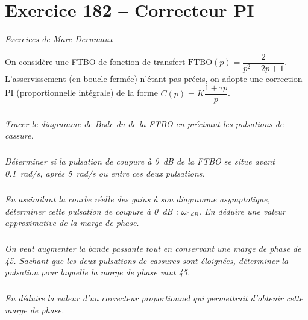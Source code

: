 \section*{Exercice 182 -- Correcteur PI}
\setcounter{exo}{0}

\textit{Exercices de Marc Derumaux}

On considère une FTBO de fonction de transfert $\text{FTBO}(p)= \dfrac{2}{p^2+2p+1}$. L'asservissement (en
boucle fermée) n'étant pas précis, on adopte une correction PI (proportionnelle intégrale) de la
forme $C( p)=K\dfrac{1+\tau p}{p}$.

\subparagraph{}
\textit{Tracer le diagramme de Bode du de la FTBO en précisant les pulsations de cassure.}
\ifprof
\begin{corrige}
\end{corrige}
\else
\fi

\subparagraph{}
\textit{Déterminer si la pulsation de coupure à \SI{0}{dB} de la FTBO se situe avant \SI{0,1}{rad/s}, après \SI{5}{
rad/s} ou entre ces deux pulsations.}
\ifprof
\begin{corrige}
\end{corrige}
\else
\fi

\subparagraph{}
\textit{En assimilant la courbe réelle des gains à son diagramme asymptotique, déterminer cette
pulsation de coupure à \SI{0}{dB} : $\omega_{\SI{0}{dB}}$. En déduire une valeur approximative de la marge de
phase.}
\ifprof
\begin{corrige}
\end{corrige}
\else
\fi

\subparagraph{}
\textit{On veut augmenter la bande passante tout en conservant une marge de phase de 45\degres.
Sachant que les deux pulsations de cassures sont éloignées, déterminer la pulsation pour
laquelle la marge de phase vaut 45\degres.}
\ifprof
\begin{corrige}
\end{corrige}
\else
\fi

\subparagraph{}
\textit{En déduire la valeur d'un correcteur proportionnel qui permettrait d'obtenir cette marge de
phase.}
\ifprof
\begin{corrige}
\end{corrige}
\else
\fi

